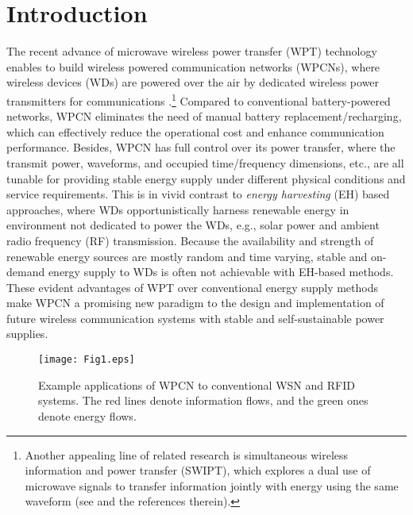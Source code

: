 \documentclass[journal, draftcls, one column, 12pt]{IEEEtran}
\begin{document}
\section{Introduction}
The recent advance of microwave wireless power transfer (WPT) technology enables to build wireless powered communication networks (WPCNs), where wireless devices (WDs) are powered over the air by dedicated wireless power transmitters for communications \cite{2015:Bi,2015:Lu,2014:Krikidis}.\footnote{Another appealing line of related research is simultaneous wireless information and power transfer (SWIPT), which explores a dual use of microwave signals to transfer information jointly with energy using the same waveform (see \cite{2015:Bi,2015:Lu,2014:Krikidis} and the references therein).} Compared to conventional battery-powered networks, WPCN eliminates the need of manual battery replacement/recharging, which can effectively reduce the operational cost and enhance communication performance. Besides, WPCN has full control over its power transfer, where the transmit power, waveforms, and occupied time/frequency dimensions, etc., are all tunable for providing stable energy supply under different physical conditions and service requirements. This is in vivid contrast to \emph{energy harvesting} (EH) based approaches, where WDs opportunistically harness renewable energy in environment not dedicated to power the WDs, e.g., solar power and ambient radio frequency (RF) transmission. Because the availability and strength of renewable energy sources are mostly random and time varying, stable and on-demand energy supply to WDs is often not achievable with EH-based methods. These evident advantages of WPT over conventional energy supply methods make WPCN a promising new paradigm to the design and implementation of future wireless communication systems with stable and self-sustainable power supplies.


\begin{figure}
\centering
  \begin{center}
    \texttt{[image: Fig1.eps]}
  \end{center}
  \caption{Example applications of WPCN to conventional WSN and RFID systems. The red lines denote information flows, and the green ones denote energy flows.}
  \label{71}
\end{figure}
\end{document}
